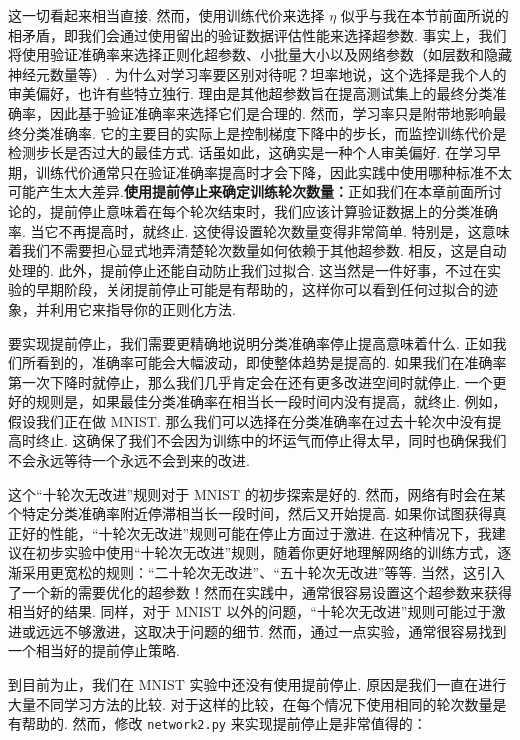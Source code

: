 这一切看起来相当直接. 然而，使用训练代价来选择 $\eta$ 似乎与我在本节前面所说的相矛盾，即我们会通过使用留出的验证数据评估性能来选择超参数. 事实上，我们将使用验证准确率来选择正则化超参数、小批量大小以及网络参数（如层数和隐藏神经元数量等）. 为什么对学习率要区别对待呢？坦率地说，这个选择是我个人的审美偏好，也许有些特立独行. 理由是其他超参数旨在提高测试集上的最终分类准确率，因此基于验证准确率来选择它们是合理的. 然而，学习率只是附带地影响最终分类准确率. 它的主要目的实际上是控制梯度下降中的步长，而监控训练代价是检测步长是否过大的最佳方式. 话虽如此，这确实是一种个人审美偏好. 在学习早期，训练代价通常只在验证准确率提高时才会下降，因此实践中使用哪种标准不太可能产生太大差异.\textbf{使用提前停止来确定训练轮次数量：}正如我们在本章前面所讨论的，提前停止意味着在每个轮次结束时，我们应该计算验证数据上的分类准确率. 当它不再提高时，就终止. 这使得设置轮次数量变得非常简单. 特别是，这意味着我们不需要担心显式地弄清楚轮次数量如何依赖于其他超参数. 相反，这是自动处理的. 此外，提前停止还能自动防止我们过拟合. 这当然是一件好事，不过在实验的早期阶段，关闭提前停止可能是有帮助的，这样你可以看到任何过拟合的迹象，并利用它来指导你的正则化方法.

要实现提前停止，我们需要更精确地说明分类准确率停止提高意味着什么. 正如我们所看到的，准确率可能会大幅波动，即使整体趋势是提高的. 如果我们在准确率第一次下降时就停止，那么我们几乎肯定会在还有更多改进空间时就停止. 一个更好的规则是，如果最佳分类准确率在相当长一段时间内没有提高，就终止. 例如，假设我们正在做 MNIST. 那么我们可以选择在分类准确率在过去十轮次中没有提高时终止. 这确保了我们不会因为训练中的坏运气而停止得太早，同时也确保我们不会永远等待一个永远不会到来的改进.

这个“十轮次无改进”规则对于 MNIST 的初步探索是好的. 然而，网络有时会在某个特定分类准确率附近停滞相当长一段时间，然后又开始提高. 如果你试图获得真正好的性能，“十轮次无改进”规则可能在停止方面过于激进. 在这种情况下，我建议在初步实验中使用“十轮次无改进”规则，随着你更好地理解网络的训练方式，逐渐采用更宽松的规则：“二十轮次无改进”、“五十轮次无改进”等等. 当然，这引入了一个新的需要优化的超参数！然而在实践中，通常很容易设置这个超参数来获得相当好的结果. 同样，对于 MNIST 以外的问题，“十轮次无改进”规则可能过于激进或远远不够激进，这取决于问题的细节. 然而，通过一点实验，通常很容易找到一个相当好的提前停止策略.

到目前为止，我们在 MNIST 实验中还没有使用提前停止. 原因是我们一直在进行大量不同学习方法的比较. 对于这样的比较，在每个情况下使用相同的轮次数量是有帮助的. 然而，修改 \texttt{network2.py} 来实现提前停止是非常值得的：

